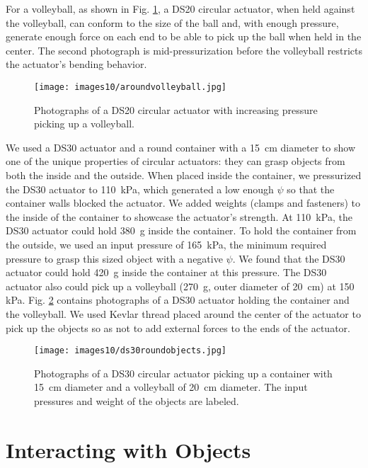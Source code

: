 For a volleyball, as shown in Fig. \ref{fig:aroundvolleyball}, a DS20 circular actuator, when held against the volleyball, can conform to the size of the ball and, with enough pressure, generate enough force on each end to be able to pick up the ball when held in the center. The second photograph is mid-pressurization before the volleyball restricts the actuator's bending behavior.

\begin{figure}[!ht]
    \centering
     \texttt{[image: images10/aroundvolleyball.jpg]}
    \caption{Photographs of a DS20 circular actuator with increasing pressure picking up a volleyball.}
    \label{fig:aroundvolleyball}
\end{figure}

We used a DS30 actuator and a round container with a 15~cm diameter to show one of the unique properties of circular actuators: they can grasp objects from both the inside and the outside. When placed inside the container, we pressurized the DS30 actuator to 110~kPa, which generated a low enough $\psi$ so that the container walls blocked the actuator. We added weights (clamps and fasteners) to the inside of the container to showcase the actuator's strength. At 110~kPa, the DS30 actuator could hold 380~g inside the container. To hold the container from the outside, we used an input pressure of 165~kPa, the minimum required pressure to grasp this sized object with a negative $\psi$. We found that the DS30 actuator could hold 420~g inside the container at this pressure. The DS30 actuator also could pick up a volleyball (270~g, outer diameter of 20~cm) at 150 kPa. Fig. \ref{fig:ds30roundobjects} contains photographs of a DS30 actuator holding the container and the volleyball. We used Kevlar thread placed around the center of the actuator to pick up the objects so as not to add external forces to the ends of the actuator.
\\
\begin{figure}[!ht]
    \centering
     \texttt{[image: images10/ds30roundobjects.jpg]}
    \caption{Photographs of a DS30 circular actuator picking up a container with 15~cm diameter and a volleyball of 20~cm diameter. The input pressures and weight of the objects are labeled.}
    \label{fig:ds30roundobjects}
\end{figure}

\clearpage
\section{Interacting with Objects}


